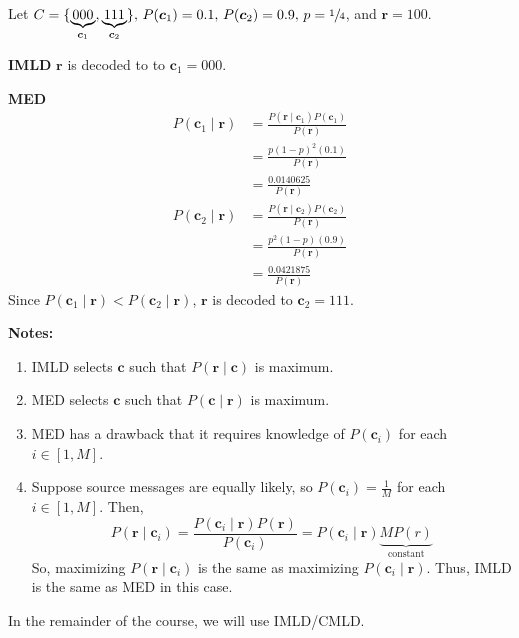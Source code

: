 \begin{exbox}
    \begin{example}[IMLD != MED]
        Let $ C=\{\underbrace{000}_{\bm{c}_1},\underbrace{111}_{\bm{c}_2}\},\,
            P(\bm{c}_1)=0.1,\, P(\bm{c}_2)=0.9,\, p=\sfrac{1}{4} $, and $ \bm{r}=100 $.

        \textbf{IMLD} $ \bm{r} $ is decoded to to $ \bm{c}_1 = 000 $.

        \textbf{MED}
        \begin{align*}
            P(\bm{c}_1\mid \bm{r})
             & =\frac{P(\bm{r}\mid \bm{c}_1)P(\bm{c}_1)}{P(\bm{r})} \\
             & =\frac{p(1-p)^2(0.1)}{P(\bm{r})}                     \\
             & =\frac{0.0140625}{P(\bm{r})}
        \end{align*}
        \begin{align*}
            P(\bm{c}_2\mid \bm{r})
             & =\frac{P(\bm{r}\mid \bm{c}_2)P(\bm{c}_2)}{P(\bm{r})} \\
             & =\frac{p^2(1-p)(0.9)}{P(\bm{r})}                     \\
             & =\frac{0.0421875}{P(\bm{r})}
        \end{align*}
        Since $ P(\bm{c}_1\mid \bm{r})<P(\bm{c}_2\mid \bm{r}) $,
        $ \bm{r} $ is decoded to $ \bm{c}_2=111 $.
    \end{example}
\end{exbox}

\textbf{Notes:}
\begin{enumerate}[label=(\roman*)]
    \item IMLD selects $ \bm{c} $ such that $ P(\bm{r}\mid \bm{c}) $ is maximum.
    \item MED selects $ \bm{c} $ such that $ P(\bm{c}\mid \bm{r}) $ is maximum.
    \item MED has a drawback that it requires knowledge of $ P(\bm{c}_i) $ for
          each $ i\in [1,M] $.
    \item Suppose source messages are equally likely, so
          $ P(\bm{c}_i)=\frac{1}{M} $ for each $ i\in[1,M] $.
          Then,
          \[ P(\bm{r}\mid \bm{c}_i)=\frac{P(\bm{c}_i\mid \bm{r})P(\bm{r})}{P(\bm{c}_i)}
              =P(\bm{c}_i\mid \bm{r}) \underbrace{M P(r)}_{\text{constant}}\]
          So, maximizing $ P(\bm{r}\mid \bm{c}_i) $ is the same as maximizing
          $ P(\bm{c}_i\mid \bm{r}) $. Thus, IMLD is the same as MED in this case.
\end{enumerate}
In the remainder of the course, we will use IMLD/CMLD\@.
